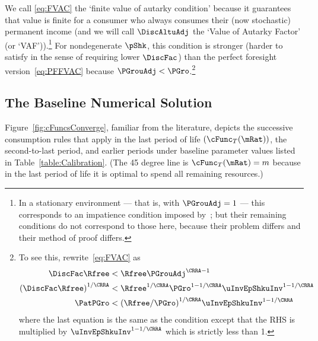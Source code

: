 \documentclass[ProjectDLO]{subfiles}
\begin{document}
We call \eqref{eq:FVAC} the `finite value of autarky condition' because it guarantees that value is finite for a consumer who always consumes their
(now stochastic) permanent income (and we will call $\DiscAltuAdj$ the `Value of Autarky Factor' (or `VAF')).\footnote{In a stationary environment --- that is, with $\PGrouAdj=1$ --- this corresponds to an impatience condition imposed by~\cite{mstIncFluct}; but their remaining conditions do not correspond to those here, because their problem differs and their method of proof differs.}  For nondegenerate $\pShk$, this
condition is stronger
(harder to satisfy in the sense of requiring lower $\DiscFac$) than
the perfect foresight version~\eqref{eq:PFFVAC} because $\PGrouAdj <
\PGro$.\footnote{To see this, rewrite~\eqref{eq:FVAC} as
  \begin{align*}
    \DiscFac \Rfree & < \Rfree \PGrouAdj^{\CRRA-1}
    \\ {(\DiscFac \Rfree)}^{1/\CRRA}  & < \Rfree^{1/\CRRA} \PGro^{1-1/\CRRA} \uInvEpShkuInv^{1-1/\CRRA}
    \\ \PatPGro & < {(\Rfree/\PGro)}^{1/\CRRA} \uInvEpShkuInv^{1-1/\CRRA}
  \end{align*}
  where the last equation is the same as the {\PFFVAC} condition except that the
  RHS is multiplied by $\uInvEpShkuInv^{1-1/\CRRA}$ which is strictly less than 1.}


\hypertarget{Baseline-Numerical-Solution}{}
\subsection{The Baseline Numerical Solution}

Figure~\ref{fig:cFuncsConverge}, familiar from the literature, depicts the successive consumption rules that apply in the last period of life $(\cFunc_{T}(\mRat))$, the second-to-last period, and earlier periods under baseline parameter values listed in Table~\ref{table:Calibration}.  (The 45 degree line is $\cFunc_{T}(\mRat) = m$ because in the last period of life it is optimal to spend all remaining resources.)

\hypertarget{Calibration}{}



\hypertarget{Symbols}{}




\renewcommand{\figName}{Convergence-of-the-Consumption-Rules} %
\renewcommand{\figFile}{cFuncsConverge} %
\end{document}
